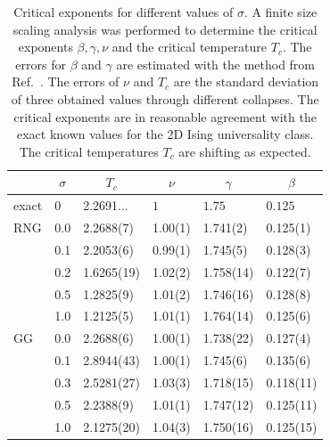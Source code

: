 \documentclass[pre,twocolumn,groupedaddress,showpacs,showkeys,amsmath,amssymb,floatfix]{revtex4-1}
\begin{document}
        \begin{table}[htb]
            \begin{ruledtabular}
                \begin{tabular}{l l l l l l}
                     & \multicolumn{1}{c}{\(\sigma\)} & \multicolumn{1}{c}{\(T_c\)} & \multicolumn{1}{c}{\(\nu\)} & \multicolumn{1}{c}{\(\gamma\)} & \multicolumn{1}{c}{\(\beta\)}\\
                    \hline
                    exact        & 0   & 2.2691... & \(1\)    & \(1.75\) & \(0.125\)\\
                    \hline
                    RNG          & 0.0 & 2.2688(7) & 1.00(1) & 1.741(2) & 0.125(1) \\
                                 & 0.1 & 2.2053(6) & 0.99(1) & 1.745(5) & 0.128(3) \\
                                 & 0.2 & 1.6265(19)& 1.02(2) & 1.758(14)& 0.122(7)\\
                                 & 0.5 & 1.2825(9) & 1.01(2) & 1.746(16)& 0.128(8)\\
                                 & 1.0 & 1.2125(5) & 1.01(1) & 1.764(14)& 0.125(6)\\
                    \hline
                    GG           & 0.0 & 2.2688(6) & 1.00(1) & 1.738(22)& 0.127(4)\\
                                 & 0.1 & 2.8944(43)& 1.00(1) & 1.745(6) & 0.135(6) \\
                                 & 0.3 & 2.5281(27)& 1.03(3) & 1.718(15)& 0.118(11)\\
                                 & 0.5 & 2.2388(9) & 1.01(1) & 1.747(12)& 0.125(11)\\
                                 & 1.0 & 2.1275(20)& 1.04(3) & 1.750(16)& 0.125(15)\\
                \end{tabular}
            \end{ruledtabular}
            \caption[Critical Exponents for Different $\sigma$]{
                Critical exponents for different values of \(\sigma\). A finite size
                scaling analysis was performed to determine the critical
                exponents \(\beta, \gamma, \nu\) and the critical temperature
                \(T_c\). The errors for \(\beta\) and \(\gamma\) are estimated
                with the method from Ref.~\cite{autoscale2009}. The errors of
                \(\nu\) and \(T_c\) are the standard deviation of three obtained
                values through different collapses. The critical exponents
                are in reasonable agreement with the exact known values for the 2D Ising
                universality class. The critical temperatures $T_c$ are shifting
                as expected.
            }
            \label{tab:critExp}
        \end{table}
\end{document}
